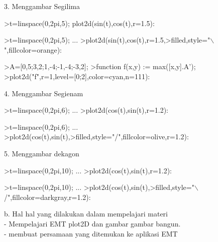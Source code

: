 \documentclass[a4paper,10pt]{article}
\begin{document}
\begin{eulernotebook}
\begin{eulercomment}
\begin{eulercomment}
\begin{eulercomment}
\begin{eulercomment}
\begin{eulercomment}
\begin{eulercomment}
\begin{eulercomment}
\begin{eulercomment}
\begin{eulercomment}
3. Menggambar Segilima
\end{eulercomment}
\begin{eulerprompt}
>t=linspace(0,2pi,5); plot2d(sin(t),cos(t),r=1.5):
\end{eulerprompt}
\begin{eulerprompt}
>t=linspace(0,2pi,5); ...
>plot2d(sin(t),cos(t),r=1.5,>filled,style="\(\backslash\)",fillcolor=orange):
\end{eulerprompt}
\begin{eulerprompt}
>A=[0,5;3,2;1,-4;-1,-4;-3,2];
>function f(x,y) := max([x,y].A');
>plot2d("f",r=1,level=[0;2],color=cyan,n=111):
\end{eulerprompt}
\begin{eulercomment}
4. Menggambar Segienam
\end{eulercomment}
\begin{eulerprompt}
>t=linspace(0,2pi,6); ...
>plot2d(cos(t),sin(t),r=1.2):
\end{eulerprompt}
\begin{eulerprompt}
>t=linspace(0,2pi,6); ...
>plot2d(cos(t),sin(t),>filled,style="/",fillcolor=olive,r=1.2):
\end{eulerprompt}
\begin{eulercomment}
5. Menggambar dekagon
\end{eulercomment}
\begin{eulerprompt}
>t=linspace(0,2pi,10); ...
>plot2d(cos(t),sin(t),r=1.2):
\end{eulerprompt}
\begin{eulerprompt}
>t=linspace(0,2pi,10); ...
>plot2d(cos(t),sin(t),>filled,style="\(\backslash\)/",fillcolor=darkgray,r=1.2):
\end{eulerprompt}
\begin{eulercomment}
b. Hal hal yang dilakukan dalam mempelajari materi\\
- Mempelajari EMT plot2D dan gambar gambar bangun.\\
- membuat persamaan yang ditemukan ke aplikasi EMT


\end{eulercomment}
\end{eulercomment}
\end{eulercomment}
\end{eulercomment}
\end{eulercomment}
\end{eulercomment}
\end{eulercomment}
\end{eulercomment}
\end{eulercomment}
\end{eulernotebook}
\end{document}
